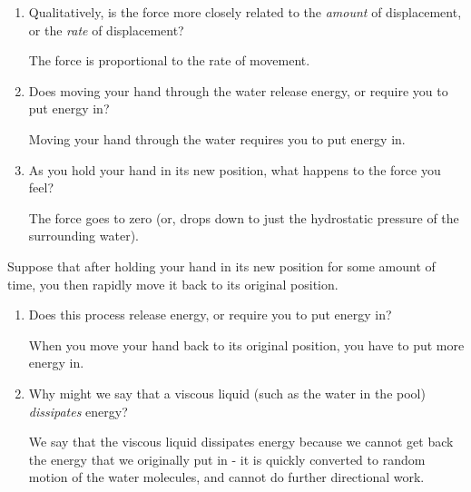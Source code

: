 \begin{activity}
\begin{ctqs}
\begin{enumerate}
			\item Qualitatively, is the force more closely related to the \emph{amount} of displacement, or the \emph{rate} of displacement?
			
				\begin{solution}[1in]
					The force is proportional to the rate of movement.
				\end{solution}
			
			\item Does moving your hand through the water release energy, or require you to put energy in?
			
				\begin{solution}[1in]
					Moving your hand through the water requires you to put energy in.
				\end{solution}
				
			\item As you hold your hand in its new position, what happens to the force you feel?
			
				\begin{solution}[1in]
					The force goes to zero (or, drops down to just the hydrostatic pressure of the surrounding water).
				\end{solution}
			
		\end{enumerate}
		
	\question Suppose that after holding your hand in its new position for some amount of time, you then rapidly move it back to its original position.
	
		\begin{enumerate}
			
			\item Does this process release energy, or require you to put energy in?
			
				\begin{solution}[1in]
					When you move your hand back to its original position, you have to put more energy in.
				\end{solution}
			
			\item Why might we say that a viscous liquid (such as the water in the pool) \emph{dissipates} energy?
			
				\begin{solution}[1in]
					We say that the viscous liquid dissipates energy because we cannot get back the energy that we originally put in - it is quickly converted to random motion of the water molecules, and cannot do further directional work.
				\end{solution}
			

\end{enumerate}
\end{ctqs}
\end{activity}
